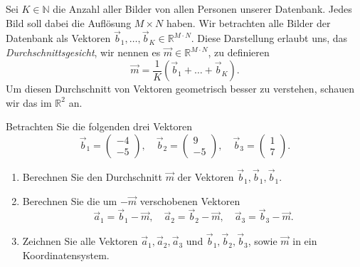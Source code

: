 Sei $K\in\mathbb N$ die Anzahl aller Bilder von allen Personen unserer Datenbank.
Jedes Bild soll dabei die Auflösung $M\times N$ haben.
Wir betrachten alle Bilder der Datenbank als Vektoren $\vec b_1,\ldots,\vec b_K\in\mathbb R^{M\cdot N}$.
Diese Darstellung erlaubt uns, das \textit{Durchschnittsgesicht}, wir nennen es $\vec m\in\mathbb R^{M\cdot N}$, zu definieren
\begin{equation*}
	\vec m=\frac{1}{K}\left(\vec b_1+\ldots+\vec b_K\right).
\end{equation*}
Um diesen Durchschnitt von Vektoren geometrisch besser zu verstehen, schauen wir das im $\mathbb R^2$ an.
\begin{aufgabe} \label{aufg:meandiff_simple}
	Betrachten Sie die folgenden drei Vektoren
	\begin{equation*}
		\vec{b}_1=
		\begin{pmatrix}
			-4 \\
			-5
		\end{pmatrix},\quad
		\vec{b}_2=
		\begin{pmatrix}
			9 \\
			-5
		\end{pmatrix},\quad
		\vec{b}_3=
		\begin{pmatrix}
			1 \\
			7
		\end{pmatrix}.
	\end{equation*}
	\begin{enumerate}[label=(\alph*)]
		\item Berechnen Sie den Durchschnitt $\vec{m}$ der Vektoren $\vec{b}_1,\vec{b}_1,\vec{b}_1$.
		\item Berechnen Sie die um $-\vec{m}$ verschobenen Vektoren
		\begin{equation*}
			\vec{a}_1=\vec{b}_1-\vec{m},\quad
			\vec{a}_2=\vec{b}_2-\vec{m},\quad
			\vec{a}_3=\vec{b}_3-\vec{m}.
		\end{equation*}
		\item Zeichnen Sie alle Vektoren $\vec{a}_1,\vec{a}_2,\vec{a}_3$ und $\vec{b}_1,\vec{b}_2,\vec{b}_3$, sowie $\vec{m}$ in ein Koordinatensystem.
	\end{enumerate}
\end{aufgabe}
